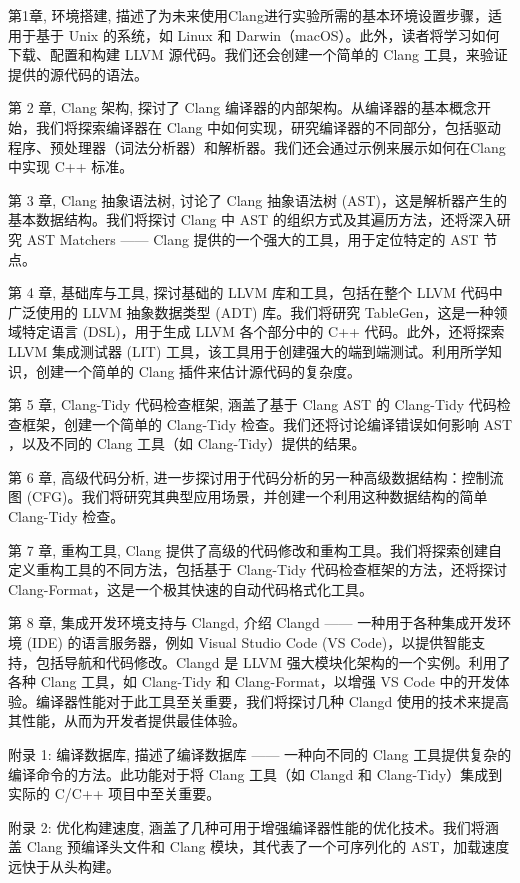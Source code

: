 
第1章, 环境搭建, 描述了为未来使用Clang进行实验所需的基本环境设置步骤，适用于基于 Unix 的系统，如 Linux 和 Darwin（macOS）。此外，读者将学习如何下载、配置和构建 LLVM 源代码。我们还会创建一个简单的 Clang 工具，来验证提供的源代码的语法。

第 2 章, Clang 架构, 探讨了 Clang 编译器的内部架构。从编译器的基本概念开始，我们将探索编译器在 Clang 中如何实现，研究编译器的不同部分，包括驱动程序、预处理器（词法分析器）和解析器。我们还会通过示例来展示如何在Clang 中实现 C++ 标准。

第 3 章, Clang 抽象语法树, 讨论了 Clang 抽象语法树 (AST)，这是解析器产生的基本数据结构。我们将探讨 Clang 中 AST 的组织方式及其遍历方法，还将深入研究 AST Matchers —— Clang 提供的一个强大的工具，用于定位特定的 AST 节点。

第 4 章, 基础库与工具, 探讨基础的 LLVM 库和工具，包括在整个 LLVM 代码中广泛使用的 LLVM 抽象数据类型 (ADT) 库。我们将研究 TableGen，这是一种领域特定语言 (DSL)，用于生成 LLVM 各个部分中的 C++ 代码。此外，还将探索 LLVM 集成测试器 (LIT) 工具，该工具用于创建强大的端到端测试。利用所学知识，创建一个简单的 Clang 插件来估计源代码的复杂度。

第 5 章, Clang-Tidy 代码检查框架, 涵盖了基于 Clang AST 的 Clang-Tidy 代码检查框架，创建一个简单的 Clang-Tidy 检查。我们还将讨论编译错误如何影响 AST ，以及不同的 Clang 工具（如 Clang-Tidy）提供的结果。

第 6 章, 高级代码分析, 进一步探讨用于代码分析的另一种高级数据结构：控制流图 (CFG)。我们将研究其典型应用场景，并创建一个利用这种数据结构的简单 Clang-Tidy 检查。

第 7 章, 重构工具, Clang 提供了高级的代码修改和重构工具。我们将探索创建自定义重构工具的不同方法，包括基于 Clang-Tidy 代码检查框架的方法，还将探讨 Clang-Format，这是一个极其快速的自动代码格式化工具。

第 8 章, 集成开发环境支持与 Clangd, 介绍 Clangd —— 一种用于各种集成开发环境 (IDE) 的语言服务器，例如 Visual Studio Code (VS Code)，以提供智能支持，包括导航和代码修改。Clangd 是 LLVM 强大模块化架构的一个实例。利用了各种 Clang 工具，如 Clang-Tidy 和 Clang-Format，以增强 VS Code 中的开发体验。编译器性能对于此工具至关重要，我们将探讨几种 Clangd 使用的技术来提高其性能，从而为开发者提供最佳体验。

附录 1: 编译数据库, 描述了编译数据库 —— 一种向不同的 Clang 工具提供复杂的编译命令的方法。此功能对于将 Clang 工具（如 Clangd 和 Clang-Tidy）集成到实际的 C/C++ 项目中至关重要。

附录 2: 优化构建速度, 涵盖了几种可用于增强编译器性能的优化技术。我们将涵盖 Clang 预编译头文件和 Clang 模块，其代表了一个可序列化的 AST，加载速度远快于从头构建。

